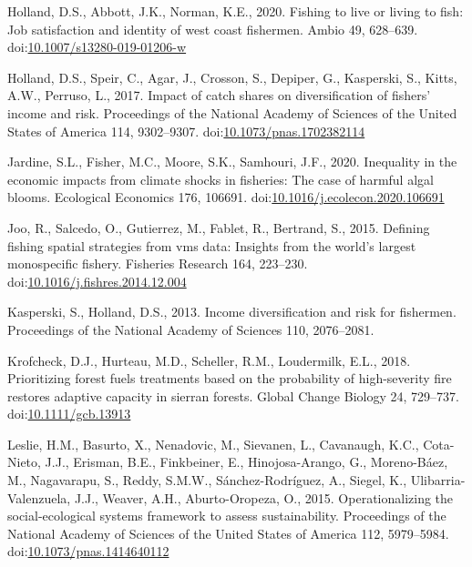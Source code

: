 \documentclass[]{elsarticle} %
\begin{document}
\leavevmode\hypertarget{ref-Holland2020}{}%
Holland, D.S., Abbott, J.K., Norman, K.E., 2020. Fishing to live or
living to fish: Job satisfaction and identity of west coast fishermen.
Ambio 49, 628--639.
doi:\href{https://doi.org/10.1007/s13280-019-01206-w}{10.1007/s13280-019-01206-w}

\leavevmode\hypertarget{ref-Holland2017}{}%
Holland, D.S., Speir, C., Agar, J., Crosson, S., Depiper, G., Kasperski,
S., Kitts, A.W., Perruso, L., 2017. Impact of catch shares on
diversification of fishers' income and risk. Proceedings of the National
Academy of Sciences of the United States of America 114, 9302--9307.
doi:\href{https://doi.org/10.1073/pnas.1702382114}{10.1073/pnas.1702382114}

\leavevmode\hypertarget{ref-Jardine2020}{}%
Jardine, S.L., Fisher, M.C., Moore, S.K., Samhouri, J.F., 2020.
Inequality in the economic impacts from climate shocks in fisheries: The
case of harmful algal blooms. Ecological Economics 176, 106691.
doi:\href{https://doi.org/10.1016/j.ecolecon.2020.106691}{10.1016/j.ecolecon.2020.106691}

\leavevmode\hypertarget{ref-Joo2015}{}%
Joo, R., Salcedo, O., Gutierrez, M., Fablet, R., Bertrand, S., 2015.
Defining fishing spatial strategies from vms data: Insights from the
world's largest monospecific fishery. Fisheries Research 164, 223--230.
doi:\href{https://doi.org/10.1016/j.fishres.2014.12.004}{10.1016/j.fishres.2014.12.004}

\leavevmode\hypertarget{ref-Kasperski2013}{}%
Kasperski, S., Holland, D.S., 2013. Income diversification and risk for
fishermen. Proceedings of the National Academy of Sciences 110,
2076--2081.

\leavevmode\hypertarget{ref-Krofcheck2018}{}%
Krofcheck, D.J., Hurteau, M.D., Scheller, R.M., Loudermilk, E.L., 2018.
Prioritizing forest fuels treatments based on the probability of
high-severity fire restores adaptive capacity in sierran forests. Global
Change Biology 24, 729--737.
doi:\href{https://doi.org/10.1111/gcb.13913}{10.1111/gcb.13913}

\leavevmode\hypertarget{ref-Leslie2015}{}%
Leslie, H.M., Basurto, X., Nenadovic, M., Sievanen, L., Cavanaugh, K.C.,
Cota-Nieto, J.J., Erisman, B.E., Finkbeiner, E., Hinojosa-Arango, G.,
Moreno-Báez, M., Nagavarapu, S., Reddy, S.M.W., Sánchez-Rodríguez, A.,
Siegel, K., Ulibarria-Valenzuela, J.J., Weaver, A.H., Aburto-Oropeza,
O., 2015. Operationalizing the social-ecological systems framework to
assess sustainability. Proceedings of the National Academy of Sciences
of the United States of America 112, 5979--5984.
doi:\href{https://doi.org/10.1073/pnas.1414640112}{10.1073/pnas.1414640112}
\end{document}
